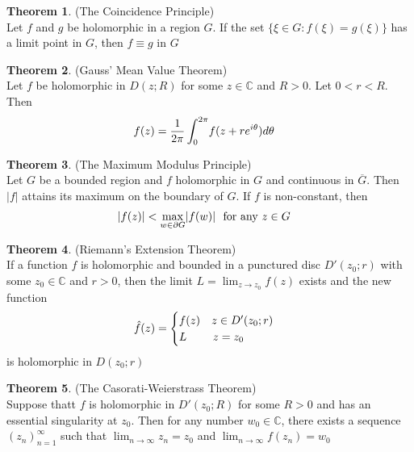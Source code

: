 \documentclass[letterpaper, 11pt]{article}
\newcommand{\C}{\mathbb{C}}   %
\newcommand{\1}{\mathds{1}}	%
\theoremstyle{definition}
\newtheorem{theorem}{Theorem}[section]
\begin{document}
\begin{theorem} (The Coincidence Principle) \\
Let $f$ and $g$ be holomorphic in a region $G$. If the set $\{\xi \in G: f(\xi) = g(\xi)\}$ has a limit point in $G$, then $f \equiv g$ in $G$

\end{theorem}

\begin{theorem} (Gauss' Mean Value Theorem) \\
Let $f$ be holomorphic in $D(z;R)$ for some $z \in \C$ and $R>0$. Let $0 < r < R$. Then
\begin{align}
f(z) = \frac{1}{2 \pi} \int _{0} ^ {2 \pi} & f(z+re^{i \theta})d\theta \notag
\end{align}
\end{theorem}

\begin{theorem} (The Maximum Modulus Principle) \\
Let $G$ be a bounded region and $f$ holomorphic in $G$ and continuous in $\overline{G}$. Then $|f|$ attains its maximum on the boundary of $G$. If $f$ is non-constant, then
\begin{align}
|f(z)| < \max _{w \in \partial G} & |f(w)| \ \text{ for any } z\in G \notag
\end{align}
\end{theorem}

\begin{theorem} (Riemann's Extension Theorem) \\
If a function $f$ is holomorphic and bounded in a punctured disc $D'(z_0; r)$ with some $z_0 \in \C$ and $r > 0$, then the limit $L = \lim _{z \to z_0} f(z)$ exists and the new function
\begin{align}
\hat{f}(z) = \begin{cases} f(z) \ \ \ z \in D'(z_0; r) \\ L \ \ \ \ \ \ \ z=z_0 \end{cases} \notag
\end{align}
is holomorphic in $D(z_0; r)$
\end{theorem}

\newpage

\begin{theorem} (The Casorati-Weierstrass Theorem) \\
Suppose thatt $f$ is holomorphic in $D'(z_0; R)$ for some $R>0$ and has an essential singularity at $z_0$. Then for any number $w_0 \in \C$, there exists a sequence $(z_n)_{n=1} ^ \infty$ such that $\lim _{n \to \infty} z_n = z_0$ and $\lim _{n \to \infty} f(z_n) = w_0$

\end{theorem}
\end{document}
